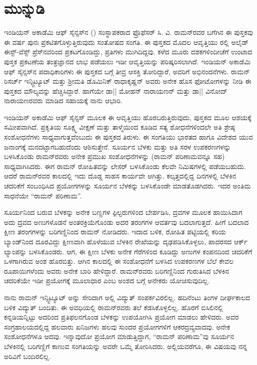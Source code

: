 
\chapter*{ಮುನ್ನುಡಿ}

ಇಂಡಿಯನ್ ಅಕಾಡೆಮಿ ಆಫ್ ಸೈನ್ಸಸ್‍ನ () ಸಂಸ್ಥಾಪಕರಾದ ಫ್ರೊಫೆಸರ್ ಸಿ. ವಿ. ರಾಮನ್‍ರವರ ಬಗೆಗಿನ ಈ ಪುಸ್ತಕವು ಈ ವರ್ಷ ಪುನಃ ಪ್ರಕಟಿತಗೊಳ್ಳುತ್ತಿರುವುದು ಸಂತೋಷದ ಸಂಗತಿ. ಈ ಪುಸ್ತಕದ ಮೊದಲ ಆವೃತ್ತಿಯು ರಲ್ಲಿ ಅಲೈಡ್ ಈಸ್ಟ್-ವೆಸ್ಟ್ ಪ್ರೆಸ್‍ನವರಿಂದ ಪ್ರಕಟಗೊಂಡಿದ್ದು, ಪ್ರತಿಗಳು ಮುಗಿದಿದ್ದವು. ಕಳೆದ ಮೂರು ದಶಕಗಳಿಂದೀಚೆಗೆ ಉಂಟಾದ ಪುಸ್ತಕ ಪ್ರಕಟಣೆಯ ತಂತ್ರಜ್ಞಾನದ ಲಾಭ ಪಡೆಯಲು ಇಡೀ ಆವೃತ್ತಿಯನ್ನು ಪರಿಷ್ಕರಿಸಲಾಗಿದೆ. ಇಂಡಿಯನ್ ಅಕಾಡೆಮಿ ಆಫ್ ಸೈನ್ಸಸ್‍ನ ಪದಾಧಿಕಾರಿಗಳು ಈ ಪುಸ್ತಕದ ಬಗ್ಗೆ ತೀವ್ರ ಆಸಕ್ತಿ ತೋರಿದ್ದಾರೆ, ಅವರಿಗೆ ಅಭಿನಂದನೆಗಳು. ರಾಮನ್ ರಿಸರ್ಚ್ ಇನ್ಸ್ಟಿಟ್ಯೂಟ್ ಮತ್ತು ಶ‍್ರೀಮತಿ ಡೊಮಿನಿಕ್ ರಾಧಾಕೃಷ್ಣನ್ ಅವರು ಅನೇಕ ಹೊಸ ಫೋಟೋಗಳನ್ನು ನೀಡಿ ಈ ಪುಸ್ತಕದ ಮೌಲ್ಯವನ್ನು ಹೆಚ್ಚಿಸಿದ್ದಾರೆ. ಹಾಗೆಯೇ ಡಾ|| ಮೋಹನ್ ನಾರಾಯಣನ್ ಮತ್ತು ಡಾ|| ವಿನೋದ್ ನಾರಾಯಣರವರು ಮಾಡಿದ ಸಹಾಯಕ್ಕೆ ನಾನು ಆಭಾರಿ.

ಇಂಡಿಯನ್ ಅಕಾಡೆಮಿ ಆಫ್ ಸೈನ್ಸಸ್ ಮೂಲಕ ಈ ಆವೃತ್ತಿಯು ಹೊರಬರುತ್ತಿರುವುದು, ಪುಸ್ತಕದ ಮೂಲ ಆಶಯಕ್ಕೆ ಸಮೀಪವಾಗಿದೆ. ಪ್ರಕೃತಿಯ ಸೂಕ್ಷ್ಮ ವೀಕ್ಷಣೆ ಮತ್ತು ತಾಳ್ಮೆಯಿಂದ ಕೂಡಿದ ಸತ್ಯ ಶೋಧನೆಗಳಿಂದಲೇ ಅತಿ ಶ್ರೇಷ್ಠ ಸಂಶೋಧನೆಗಳು ಸಾಧ್ಯವಾಗುತ್ತವೆಂಬುದು ಈ ಪುಸ್ತಕದ ತಿರುಳು. ಈ ಸಂಗತಿಯು ಭಾರತದ ಹಾಗೂ ವಿದೇಶದ ಯುವ ಜನಾಂಗಕ್ಕೆ ಮನದಟ್ಟಾಗಬಹುದೆಂದು ಆಶಿಸುತ್ತೇನೆ. ಸೂರ್ಯನ ಬೆಳಕು ಮತ್ತು ಅತಿ ಸರಳ ಉಪಕರಣಗಳನ್ನು ಬಳಸಿಕೊಂಡು ರಾಮನ್‍ರವರು ಅನೇಕ ಪ್ರಮುಖ ಸಂಶೋಧನೆಗಳನ್ನು (ರಾಮನ್ ಪರಿಣಾಮವನ್ನೂ ಸಹ) ಸಾಧ್ಯವಾಗಿಸಿದರು. ಈಗ ರಾಮನ್ ರೋಹಿತವನ್ನು  ಲೇಸರ್ ಬಳಸಿಕೊಂಡು ಕೆಲವೇ ನಿಮಿಷಗಳಲ್ಲಿ ಪಡೆಯಬಹುದು. ಆದರೆ ರಾಮನ್‍ರವರ ಕಾಲದಲ್ಲಿ ಇದು ದೊಡ್ಡ ಸಾಹಸ ಕಾರ್ಯವೇ ಆಗಿತ್ತು. ಕಲ್ಕತ್ತದಲ್ಲಿದ್ದ ದಿನಗಳಲ್ಲಿ ಬೆಳಕಿನ ಚದರಿಕೆಗೆ ಸಂಬಂಧಿಸಿದ ಪ್ರಯೋಗಗಳನ್ನು ಸೂರ್ಯನ ಬೆಳಕನ್ನು ಬಳಸಿಕೊಂಡೇ ಮಾಡತೊಡಗಿದರು. ಇದರ ಅಂತಿಮ ಸಾಧನೆಯೇ “ರಾಮನ್ ಪರಿಣಾಮ”.

ಸೂರ್ಯನಿಂದ ಬರುವ ಬೆಳಕನ್ನು ಅನೇಕ ಬಣ್ಣಗಳ ಫಿ಼ಲ್ಟರುಗಳಿಂದ ಬೇರ್ಪಡಿಸಿ, ದ್ರವಗಳ ಮೂಲಕ ಹಾಯಿಸಿದಾಗ ಅದು ದ್ರವದ ಅಣುಗಳೊಡನೆ ಅಂತರಕ್ರಿಯೆಗೊಂಡು ಅದರ ತರಂಗಗಳ ಆವರ್ತವು ಬದಲಾಗುತ್ತದೆ. ಹೀಗೆ ಬದಲಾದ ಕ್ಷೀಣ ತರಂಗಗಳನ್ನು ಬರಿಗಣ್ಣಿನಿಂದ ರಾಮನ್ ನೋಡಿದರು. ಇದಾದ ಬಳಿಕ, ರೋಹಿತ ಪಟ್ಟಿಯಲ್ಲಿ ಕರಿಯ ಬ್ಯಾಂಡ್‍ನಿಂದ ದೂರವಿದ್ದು ಕ್ಷೀಣವಾಗಿ ಹೊಳೆಯುವ ಬೆಳಕಿನ ರೇಖೆಯನ್ನು ದೃಢಪಡಿಸಿಕೊಳ್ಳಲು, ಪಾದರಸದ ಆರ್ಕ್ ಲ್ಯಾಂಪನ್ನು ಬಳಸಿಕೊಂಡರು. ಆಗ, ಈ ಕ್ಷೀಣ ಬೆಳಕು ಅನೇಕ ಗೆರೆಗಳಿಂದ ಕೂಡಿದ್ದು ಅಣುಗಳ ಕಂಪನದಿಂದ ಚದರಿಕೆಗೆ ಒಳಗಾಗಿರುವ ಅಂಶ ಹೊರಬಿತ್ತು. ಆಗಿನ ಕಾಲದಲ್ಲಿ ಈ ಸಂಶೋಧನೆಗೆ ಬಳಸಿದ ಉಪಕರಣಗಳ ಬೆಲೆ ಕೇವಲ  ರೂಪಾಯಿಗಳೆಂದು ಅವರು ಅನೇಕ ಬಾರಿ ಹೇಳಿದ್ದಾರೆ. ರಾಮನ್‍ರವರು ಬರಿಗಣ್ಣಿನಿಂದ ಗುರುತಿಸಿದ ಬೆಳಕಿನ ಚದರಿಕೆಯೇ ಇಡೀ ಪ್ರಯೋಗಕ್ಕೆ ಮೂಲಾಧಾರ ಎಂಬ ಅಂಶದ ಬಗ್ಗೆ ಅನೇಕರು ಯೋಚಿಸುವುದಿಲ್ಲ.

ನಾನು ರಾಮನ್ ಇನ್ಸ್ಟಿಟ್ಯೂಟ್ ಅನ್ನು ಸೇರಿದಾಗ ಅಲ್ಲಿ ವಿದ್ಯುತ್ ಸಂಪರ್ಕವಿರಲಿಲ್ಲ. ಹದಿನೆಂಟು ತಿಂಗಳ ದೀರ್ಘಕಾಲದ ಬಳಿಕ ವಿದ್ಯುತ್ ಬಂದಿತು. ಈ ಅವಧಿಯಲ್ಲಿ ರಾಮನ್‍ರವರು ತಲೆ ಕೆಡಸಿಕೊಳ್ಳಲಿಲ್ಲ. ಹೊರಗೆ ಬಿಸಿಲಿನಲ್ಲಿ ಕನ್ನಡಿಯನ್ನಿಟ್ಟು ಅದರಿಂದ ಪ್ರತಿಫಲನಗೊಂಡ ಬೆಳಕನ್ನು ಉಪಯೋಗಿಸಿ ಪ್ರಯೋಗ ಮಾಡಲು ಹೇಳಿದರು. ಅವರ ಸಂಗ್ರಹಾಲಯದಲ್ಲಿದ್ದ ಹಲವಾರು ಖನಿಜಗಳು ಹಲವು ಸುಂದರ ಪ್ರಯೋಗಗಳಿಗೆ ಆಕರದ್ರವ್ಯವಾದವು. ಅನೇಕ ಸಂಶೋಧನೆಗಳೂ ಆದವು. ಇನ್ನಾವುದೋ ಪ್ರಯೋಗ ಮಾಡುತ್ತಿದ್ದಾಗ, “ರಾಮನ್ ಪರಿಣಾಮ”ವು ಸೂರ್ಯನ ಬೆಳಕಿನಲ್ಲಿ ಬರಿಗಣ್ಣಿಗೆ ಕಾಣುವ ಸಂಗತಿಯನ್ನು ಅವರೇ ಒಮ್ಮೆ ತೋರಿಸಿದರು. ಅಲ್ಲಿಯವರೆಗೂ, ಈ ವಿಷಯವು ನನ್ನ ಅರಿವಿಗೆ ಬಂದಿರಲಿಲ್ಲ.

